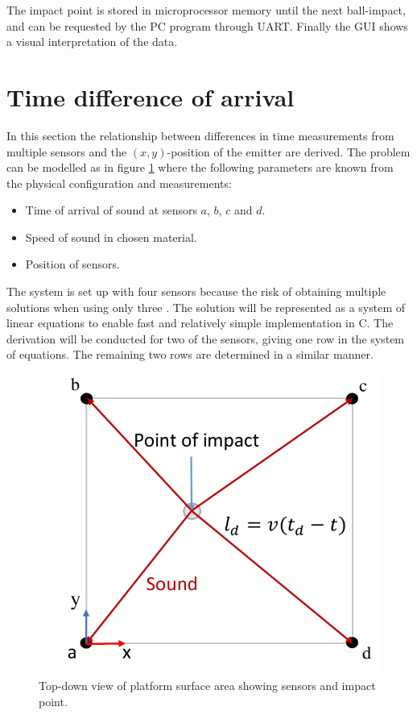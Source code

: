 	The impact point is stored in microprocessor memory until the next ball-impact, and can be requested by the PC program through UART.
	Finally the GUI shows a visual interpretation of the data.

	\section{Time difference of arrival}
	In this section the relationship between differences in time measurements from multiple sensors and the $(x,y)$-position of the emitter are derived.
	The problem can be modelled as in figure \ref{fig:tdoa_model} where the following parameters are known from the physical configuration and measurements:
	\begin{itemize}
		\item Time of arrival of sound at sensors $a$, $b$, $c$ and $d$.
		\item Speed of sound in chosen material.
		\item Position of sensors.
	\end{itemize}

	The system is set up with four sensors because the risk of obtaining multiple solutions when using only three \cite{tdoa_book}.
	The solution will be represented as a system of linear equations to enable fast and relatively simple implementation in C.
	The derivation will be conducted for two of the sensors, giving one row in the system of equations. The remaining two rows are determined in a similar manner.
	\begin{figure}[htb]
		\centering
		\includegraphics[width=.6\textwidth]{figures/tdoa_model}
		\caption{Top-down view of platform surface area showing sensors and impact point.}
		\label{fig:tdoa_model}
	\end{figure}

